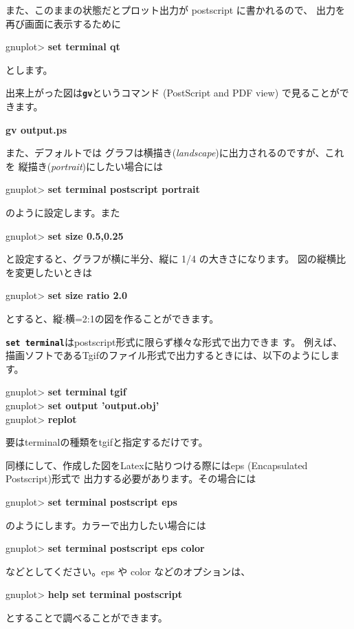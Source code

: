 \documentclass[a4j]{ujarticle} %
\newenvironment{terminal}{%
  \begin{center}
   \begin{minipage}{.8\textwidth}
    \setlength{\FrameSep}{.5\FrameSep}%
    \begin{framed}\ttfamily\small%
     \setlength\baselineskip{.85\baselineskip}%
}{%
    \end{framed}
   \end{minipage}
  \end{center}%
}
\begin{document}
また、このままの状態だとプロット出力が postscript に書かれるので、
出力を再び画面に表示するために
\begin{terminal}
 gnuplot> {\bf set terminal qt}
\end{terminal}
とします。

出来上がった図は{\tt\bf gv}というコマンド (PostScript and PDF view) で見ることができます。
\begin{terminal}
{\bf gv output.ps}
\end{terminal}

また、デフォルトでは
グラフは横描き({\it landscape})に出力されるのですが、これを
縦描き({\it portrait})にしたい場合には
\begin{terminal}
 gnuplot> {\bf set terminal postscript portrait}
\end{terminal}
のように設定します。また
\begin{terminal}
 gnuplot> {\bf set size 0.5,0.25}
\end{terminal}
と設定すると、グラフが横に半分、縦に 1/4 の大きさになります。
図の縦横比を変更したいときは
\begin{terminal}
 gnuplot> {\bf set size ratio 2.0}
\end{terminal}
とすると、縦:横=2:1の図を作ることができます。

{\tt \bf set terminal}はpostscript形式に限らず様々な形式で出力できま
す。
例えば、描画ソフトであるTgifのファイル形式で出力するときには、以下のようにします。
\begin{terminal}
 gnuplot> {\bf set terminal tgif} \\
 gnuplot> {\bf set output 'output.obj'} \\
 gnuplot> {\bf replot}
\end{terminal}

要はterminalの種類をtgifと指定するだけです。

同様にして、作成した図をLatexに貼りつける際にはeps (Encapsulated Postscript)形式で
出力する必要があります。その場合には
\begin{terminal}
 gnuplot> {\bf set terminal postscript eps}
\end{terminal}
のようにします。カラーで出力したい場合には
\begin{terminal}
 gnuplot> {\bf set terminal postscript eps color}
\end{terminal}
などとしてください。eps や color などのオプションは、
\begin{terminal}
 gnuplot> {\bf help set terminal postscript}
\end{terminal}
とすることで調べることができます。
\end{document}
